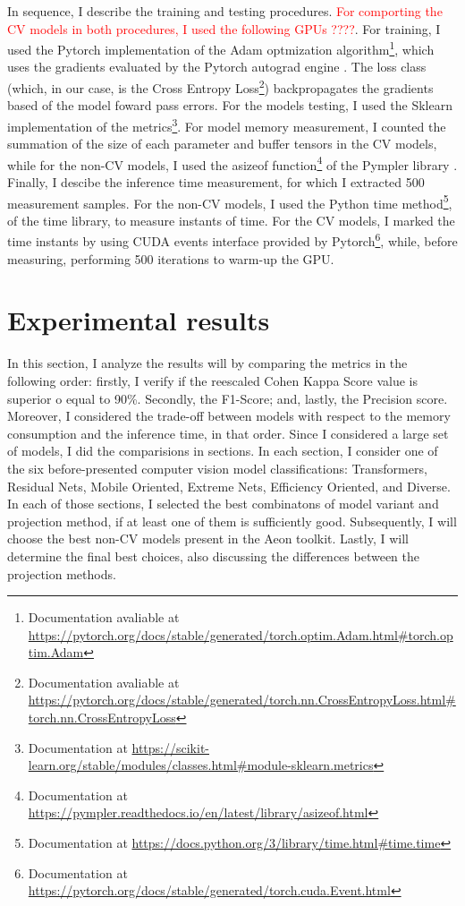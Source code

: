 In sequence, I describe the training and testing procedures. \textcolor{red}{For comporting the \acrshort{CV} models in both procedures, I used the following GPUs ????}. For training, I used the Pytorch implementation of the Adam optmization algorithm\footnote{Documentation avaliable at \url{https://pytorch.org/docs/stable/generated/torch.optim.Adam.html\#torch.optim.Adam}}, which uses the gradients evaluated by the Pytorch autograd engine \cite{Pytorch}. The loss class (which, in our case, is the Cross Entropy Loss\footnote{Documentation avaliable at \url{https://pytorch.org/docs/stable/generated/torch.nn.CrossEntropyLoss.html\#torch.nn.CrossEntropyLoss}}) backpropagates the gradients based of the model foward pass errors. For the models testing, I used the Sklearn \cite{Sklearn} implementation of the metrics\footnote{Documentation at \url{https://scikit-learn.org/stable/modules/classes.html\#module-sklearn.metrics}}. For model memory measurement, I counted the summation of the size of each parameter and buffer tensors in the \acrshort{CV} models, while for the non-\acrshort{CV} models, I used the asizeof function\footnote{Documentation at \url{https://pympler.readthedocs.io/en/latest/library/asizeof.html}} of the Pympler library \cite{Pympler}. Finally, I descibe the inference time measurement, for which I extracted 500 measurement samples.  For the non-\acrshort{CV} models, I used the Python time method\footnote{Documentation at \url{https://docs.python.org/3/library/time.html\#time.time}}, of the time library, to measure instants of time. For the \acrshort{CV} models, I marked the time instants by using CUDA events interface provided by Pytorch\footnote{Documentation at \url{https://pytorch.org/docs/stable/generated/torch.cuda.Event.html}}, while, before measuring, performing 500 iterations to warm-up the GPU. 

\section{Experimental results}


In this section, I analyze the results will by comparing the metrics in the following order: firstly, I verify if the reescaled Cohen Kappa Score value is superior o equal to 90\%. Secondly, the F1-Score; and, lastly, the Precision score. Moreover, I considered the trade-off between models with respect to the memory consumption and the inference time, in that order. Since I considered a large set of models, I did the comparisions in sections. In each section, I consider one of the six before-presented computer vision model classifications: Transformers, Residual Nets, Mobile Oriented, Extreme Nets, Efficiency Oriented, and Diverse. In each of those sections, I selected the best combinatons of model variant and projection method, if at least one of them is sufficiently good. Subsequently, I will choose the best non-\acrshort{CV} models present in the Aeon toolkit. Lastly, I will determine the final best choices, also discussing the differences between the projection methods.

